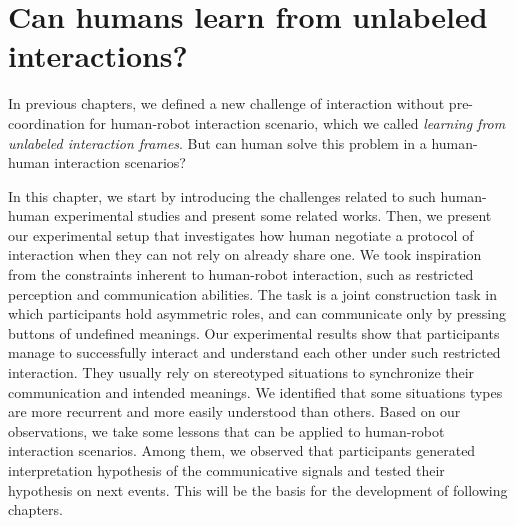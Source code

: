 
\chapter{Can humans learn from unlabeled interactions?}
\label{chapter:humanexperiment}
\minitoc


In previous chapters, we defined a new challenge of interaction without pre-coordination for human-robot interaction scenario, which we called \emph{learning from unlabeled interaction frames}. But can human solve this problem in a human-human interaction scenarios?

In this chapter, we start by introducing the challenges related to such human-human experimental studies and present some related works. Then, we present our experimental setup that investigates how human negotiate a protocol of interaction when they can not rely on already share one. We took inspiration from the constraints inherent to human-robot interaction, such as restricted perception and communication abilities. The task is a joint construction task in which participants hold asymmetric roles, and can communicate only by pressing buttons of undefined meanings. Our experimental results show that participants manage to successfully interact and understand each other under such restricted interaction. They usually rely on stereotyped situations to synchronize their communication and intended meanings. We identified that some situations types are more recurrent and more easily understood than others. Based on our observations, we take some lessons that can be applied to human-robot interaction scenarios. Among them, we observed that participants generated interpretation hypothesis of the communicative signals and tested their hypothesis on next events. This will be the basis for the development of following chapters. 

